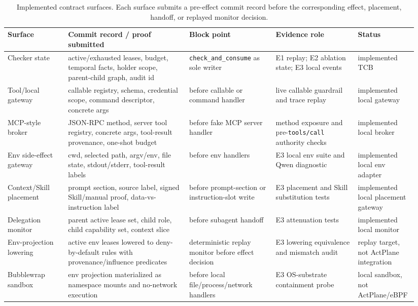 \documentclass[UTF8,a4paper,11pt]{ctexart}
\begin{document}
\begin{table}[t]
\centering
\tiny
\setlength{\tabcolsep}{1pt}
\caption{Implemented contract surfaces. Each surface submits a pre-effect commit record before the corresponding effect, placement, handoff, or replayed monitor decision.}
\label{tab:implemented-contract-surfaces}
\begin{tabular}{p{0.14\linewidth}p{0.28\linewidth}p{0.20\linewidth}p{0.19\linewidth}p{0.13\linewidth}}
\toprule
Surface & Commit record / proof submitted & Block point & Evidence role & Status \\
\midrule
Checker state & active/exhausted leases, budget, temporal facts, holder scope, parent-child graph, audit id & \texttt{check\_and\_consume} as sole writer & E1 replay; E2 ablation state; E3 local events & implemented TCB \\
Tool/local gateway & callable registry, schema, credential scope, command descriptor, concrete args & before callable or command handler & live callable guardrail and trace replay & implemented local gateway \\
MCP-style broker & JSON-RPC method, server tool registry, concrete args, tool-result provenance, one-shot budget & before fake MCP server handler & method exposure and pre-\texttt{tools/call} authority checks & implemented local broker \\
Env side-effect gateway & cwd, selected path, argv/env, file state, stdout/stderr, tool-result labels & before env handlers & E3 local env suite and Qwen diagnostic & implemented local env adapter \\
Context/Skill placement & prompt section, source label, signed Skill/manual proof, data-vs-instruction label & before prompt-section or instruction-slot write & E3 placement and Skill substitution tests & implemented local placement gateway \\
Delegation monitor & parent active lease set, child role, child capability set, context slice & before subagent handoff & E3 attenuation tests & implemented local monitor \\
Env-projection lowering & active env leases lowered to deny-by-default rules with provenance/influence predicates & deterministic replay monitor before effect decision & E3 lowering equivalence and mismatch audit & replay target, not ActPlane integration \\
Bubblewrap sandbox & env projection materialized as namespace mounts and no-network execution & before local file/process/network handlers & E3 OS-substrate containment probe & local sandbox, not ActPlane/eBPF \\
\bottomrule
\end{tabular}
\end{table}
\end{document}
